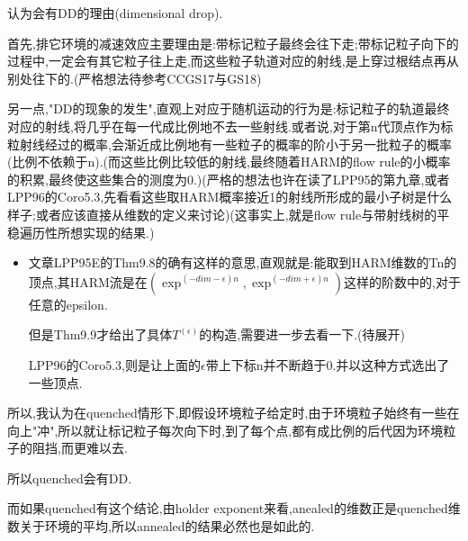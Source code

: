 				\begin{conjec}

					认为会有DD的理由(dimensional drop).

					首先,排它环境的减速效应主要理由是:带标记粒子最终会往下走;带标记粒子向下的过程中,一定会有其它粒子往上走,而这些粒子轨道对应的射线,是上穿过根结点再从别处往下的.(严格想法待参考CCGS17与GS18)

					另一点,"DD的现象的发生",直观上对应于随机运动的行为是:标记粒子的轨道最终对应的射线,将几乎在每一代成比例地不去一些射线.或者说,对于第n代顶点作为标粒射线经过的概率,会渐近成比例地有一些粒子的概率的阶小于另一批粒子的概率(比例不依赖于n).(而这些比例比较低的射线,最终随着HARM的flow rule的小概率的积累,最终使这些集合的测度为0.)(严格的想法也许在读了LPP95的第九章,或者LPP96的Coro5.3,先看看这些取HARM概率接近1的射线所形成的最小子树是什么样子;或者应该直接从维数的定义来讨论)(这事实上,就是flow rule与带射线树的平稳遍历性所想实现的结果.)

						\begin{itemize}
							\item 

							文章LPP95E的Thm9.8的确有这样的意思,直观就是:能取到HARM维数的Tn的顶点,其HARM流是在$(\exp^{(-dim-\epsilon)n},\exp^{(-dim+\epsilon)n})$这样的阶数中的,对于任意的epsilon.

							但是Thm9.9才给出了具体$T^(\epsilon)$的构造,需要进一步去看一下.(待展开)

							LPP96的Coro5.3,则是让上面的$\epsilon$带上下标n并不断趋于0.并以这种方式选出了一些顶点.
						\end{itemize}

					所以,我认为在quenched情形下,即假设环境粒子给定时,由于环境粒子始终有一些在向上"冲",所以就让标记粒子每次向下时,到了每个点,都有成比例的后代因为环境粒子的阻挡,而更难以去.

					所以quenched会有DD.

					而如果quenched有这个结论,由holder exponent来看,anealed的维数正是quenched维数关于环境的平均,所以annealed的结果必然也是如此的.
				\end{conjec}

